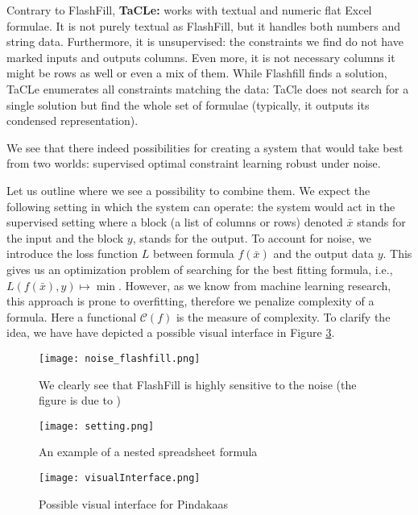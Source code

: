Contrary to FlashFill, \textbf{TaCLe:} works with textual and numeric flat Excel formulae. It is not purely
    textual as FlashFill, but it handles both numbers and string data. Furthermore, it is unsupervised: the constraints we find do not have marked 
    inputs and outputs columns. Even more, it is not necessary columns it might be rows as well or even a mix of them.
  While Flashfill finds a solution, TaCLe enumerates all constraints matching the data: TaCle does not
    search for a single solution but find the whole set of formulae
    (typically, it outputs its condensed representation).

We see that there indeed possibilities for creating a system that
would take best from two worlds: supervised optimal constraint
learning robust under noise.

\pubrev
Let us outline where we see a possibility to combine them. We expect the following setting in which the system can operate: the system would act in the supervised setting where a block (a list of columns or rows) denoted $\bar x$ stands for the input and the block $y$, stands for the output. To account for noise, we introduce the loss function $L$ between formula $f(\bar x)$ and the output data $y$. This gives us an optimization problem of searching for the best fitting formula, i.e., $L(f(\bar x),y) \mapsto \min$. However, as we know from machine learning research, this approach is prone to overfitting, therefore we penalize complexity of a formula. Here a functional $\mathcal{C}(f)$ is the measure of complexity. To clarify the idea, we have have depicted a possible visual interface in Figure \ref{fig:visual_interface}.
\pubrevend


\begin{figure}[htb]
 \centering
 \texttt{[image: noise\_flashfill.png]}
 \caption{We clearly see that FlashFill is highly sensitive to the
   noise (the figure is due to \textcite{robustfill})}
  \label{fig:flashfill_noise}
\end{figure}

\begin{figure}[htb]
 \centering
 \texttt{[image: setting.png]}
 \caption{An example of a nested spreadsheet formula}
  \label{fig:nested_formula}
\end{figure}

\begin{figure}[htb]
 \centering
 \texttt{[image: visualInterface.png]}
 \caption{Possible visual interface for Pindakaas}
  \label{fig:visual_interface}
\end{figure}

